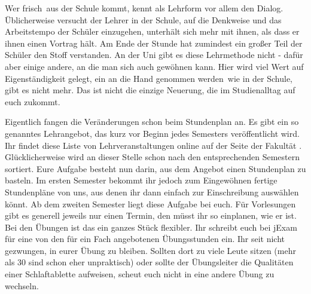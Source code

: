 

Wer \glqq frisch\grqq\ aus der Schule kommt, kennt als Lehrform vor allem den Dialog.
Üblicherweise versucht der Lehrer in der Schule, auf die Denkweise und das Arbeitstempo der Schüler einzugehen, unterhält sich mehr mit ihnen, als dass er ihnen einen Vortrag hält.
Am Ende der Stunde hat zumindest ein großer Teil der Schüler den Stoff verstanden.
An der Uni gibt es diese Lehrmethode nicht - dafür aber einige andere, an die man sich auch gewöhnen kann.
Hier wird viel Wert auf Eigenständigkeit gelegt, ein \glqq an die Hand genommen werden\grqq\ wie in der Schule, gibt es nicht mehr.
Das ist nicht die einzige Neuerung, die im Studienalltag auf euch zukommt.


Eigentlich fangen die Veränderungen schon beim Stundenplan an.
Es gibt ein so genanntes Lehrangebot, das kurz vor Beginn jedes Semesters veröffentlicht wird.
Ihr findet diese Liste von Lehrveranstaltungen online auf der Seite der Fakultät \link{\textcolor{red}{NONE}}.
Glücklicherweise wird an dieser Stelle schon nach den entsprechenden Semestern sortiert.
Eure Aufgabe besteht nun darin, aus dem Angebot einen Stundenplan zu basteln.
Im ersten Semester bekommt ihr jedoch zum Eingewöhnen fertige Stundenpläne von uns, aus denen ihr dann einfach zur Einschreibung auswählen könnt.
Ab dem zweiten Semester liegt diese Aufgabe bei euch.
Für Vorlesungen gibt es generell jeweils nur einen Termin, den müsst ihr so einplanen, wie er ist.
Bei den Übungen ist das ein ganzes Stück flexibler.
Ihr schreibt euch bei jExam \link{\textcolor{red}{NONE}} für eine von den für ein Fach angebotenen Übungsstunden ein.
Ihr seit nicht gezwungen, in eurer Übung zu bleiben.
Sollten dort zu viele Leute sitzen (mehr als 30 sind schon eher unpraktisch) oder sollte der Übungsleiter die Qualitäten einer Schlaftablette aufweisen, scheut euch nicht in eine andere Übung zu wechseln.


